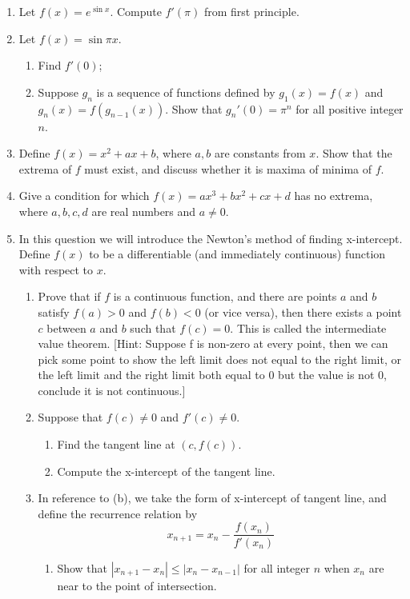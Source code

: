 \documentclass[12pt]{article}
\begin{document}
\begin{enumerate}
    \item Let $f(x)=e^{\sin{x}}$. Compute $f'(\pi)$ from first principle.
    \item Let $f(x)=\sin{\pi x}$.\begin{enumerate}
        \item Find $f'(0)$;
        \item Suppose $g_n$ is a sequence of functions defined by $g_1(x)=f(x)$ and $g_n(x)=f(g_{n-1}(x))$. Show that $g_n'(0)=\pi^n$ for all positive integer $n$.
    \end{enumerate}
    \item Define $f(x)=x^2+ax+b$, where $a,b$ are constants from $x$. Show that the extrema of $f$ must exist, and discuss whether it is maxima of minima of $f$.
    \item Give a condition for which $f(x)=ax^3+bx^2+cx+d$ has no extrema, where $a,b,c,d$ are real numbers and $a\neq 0$.
    \item In this question we will introduce the Newton's method of finding x-intercept. Define $f(x)$ to be a differentiable (and immediately continuous) function with respect to $x$.\begin{enumerate}
        \item Prove that if $f$ is a continuous function, and there are points $a$ and $b$ satisfy $f(a)>0$ and $f(b)<0$ (or vice versa), then there exists a point $c$ between $a$ and $b$ such that $f(c)=0$. This is called the intermediate value theorem. [Hint: Suppose f is non-zero at every point, then we can pick some point to show the left limit does not equal to the right limit, or the left limit and the right limit both equal to 0 but the value is not 0, conclude it is not continuous.]
        \item Suppose that $f(c)\neq 0$ and $f'(c)\neq 0$. \begin{enumerate}
            \item Find the tangent line at $(c,f(c))$.
            \item Compute the x-intercept of the tangent line.
        \end{enumerate}
        \item In reference to (b), we take the form of x-intercept of tangent line, and define the recurrence relation by $$x_{n+1}=x_n-\frac{f(x_n)}{f'(x_n)}$$ \begin{enumerate}
            \item Show that $|x_{n+1}-x_n|\leq |x_n-x_{n-1}|$ for all integer $n$ when $x_n$ are near to the point of intersection.

\end{enumerate}
\end{enumerate}
\end{enumerate}
\end{document}

